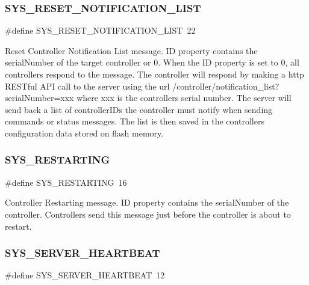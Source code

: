 \subsubsection{\texorpdfstring{S\+Y\+S\+\_\+\+R\+E\+S\+E\+T\+\_\+\+N\+O\+T\+I\+F\+I\+C\+A\+T\+I\+O\+N\+\_\+\+L\+I\+ST}{SYS\_RESET\_NOTIFICATION\_LIST}}
{\footnotesize\ttfamily \#define S\+Y\+S\+\_\+\+R\+E\+S\+E\+T\+\_\+\+N\+O\+T\+I\+F\+I\+C\+A\+T\+I\+O\+N\+\_\+\+L\+I\+ST~22}

Reset Controller Notification List message. ID property contains the serial\+Number of the target controller or 0. When the ID property is set to 0, all controllers respond to the message. The controller will respond by making a http R\+E\+S\+Tful A\+PI call to the server using the url /controller/notification\+\_\+list?serial\+Number=xxx where xxx is the controller\textquotesingle{}s serial number. The server will send back a list of controller\+I\+Ds the controller must notify when sending commands or status messages. The list is then saved in the controller\textquotesingle{}s configuration data stored on flash memory. \mbox{\label{group___u_d_p_message_i_d_ga9ed42f3a7fcc253fa49ce8ff33a75422}} 
\subsubsection{\texorpdfstring{S\+Y\+S\+\_\+\+R\+E\+S\+T\+A\+R\+T\+I\+NG}{SYS\_RESTARTING}}
{\footnotesize\ttfamily \#define S\+Y\+S\+\_\+\+R\+E\+S\+T\+A\+R\+T\+I\+NG~16}

Controller Restarting message. ID property contains the serial\+Number of the controller. Controllers send this message just before the controller is about to restart. \mbox{\label{group___u_d_p_message_i_d_gaddd0be32c40eb5aa6ff7247ec41d402d}} 
\subsubsection{\texorpdfstring{S\+Y\+S\+\_\+\+S\+E\+R\+V\+E\+R\+\_\+\+H\+E\+A\+R\+T\+B\+E\+AT}{SYS\_SERVER\_HEARTBEAT}}
{\footnotesize\ttfamily \#define S\+Y\+S\+\_\+\+S\+E\+R\+V\+E\+R\+\_\+\+H\+E\+A\+R\+T\+B\+E\+AT~12}

